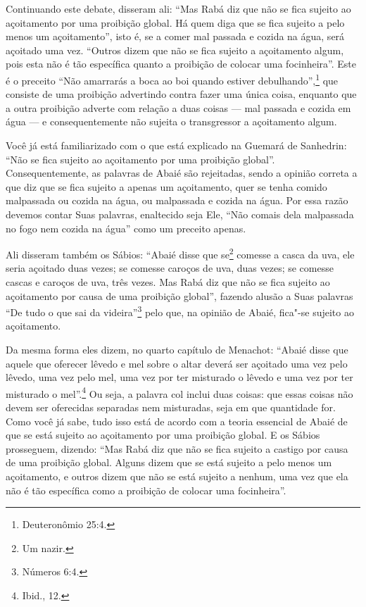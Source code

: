 Continuando este debate, disseram ali: ``Mas Rabá\starr{} diz que não se fica
sujeito ao açoitamento por uma proibição global. Há quem diga que se
fica sujeito a pelo menos um açoitamento'', isto é, se a comer mal
passada e cozida na água, será açoitado uma vez. ``Outros dizem que não
se fica sujeito a açoitamento algum, pois esta não é tão específica
quanto a proibição de colocar uma focinheira''. Este é o preceito ``Não
amarrarás a boca ao boi quando estiver debulhando'',\footnote{Deuteronômio
25:4.} que consiste de uma proibição advertindo contra fazer uma única
coisa, enquanto que a outra proibição adverte com relação a duas coisas
--- mal passada e cozida em água --- e consequentemente não sujeita o
transgressor a açoitamento algum.


Você já está familiarizado com o que está explicado na Guemará\starr{} de
Sanhedrin\starr: ``Não se fica sujeito ao açoitamento por uma proibição
global''. Consequentemente, as palavras de Abaié\starr{} são rejeitadas, sendo
a opinião correta a que diz que se fica sujeito a apenas um açoitamento,
quer se tenha comido malpassada ou cozida na água, ou malpassada e
cozida na água. Por essa razão devemos contar Suas palavras, enaltecido
seja Ele, ``Não comais dela malpassada no fogo nem cozida na água''
como um preceito apenas.

Ali disseram também os Sábios: ``Abaié\starr{} disse que se\footnote{Um nazir\starr.}
comesse a casca da uva, ele seria açoitado duas vezes; se comesse
caroços de uva, duas vezes; se comesse cascas e caroços de uva, três
vezes. Mas Rabá\starr{} diz que não se fica sujeito ao açoitamento por causa de
uma proibição global'', fazendo alusão a Suas palavras ``De tudo o que
sai da videira''\footnote{Números 6:4.} pelo que, na opinião de Abaié\starr, fica"-se
sujeito ao açoitamento.

Da mesma forma eles dizem, no quarto capítulo de Menachot\starr: ``Abaié\starr{} disse
que aquele que oferecer lêvedo e mel sobre o altar deverá ser açoitado
uma vez pelo lêvedo, uma vez pelo mel, uma vez por ter misturado o
lêvedo e uma vez por ter misturado o mel''.\footnote{Ibid., 12.} Ou seja, a palavra
col\starr{} inclui duas coisas: que essas coisas não devem ser oferecidas
separadas nem misturadas, seja em que quantidade for. Como você já sabe,
tudo isso está de acordo com a teoria essencial de Abaié\starr{} de que se está
sujeito ao açoitamento por uma proibição global. E os Sábios
prosseguem, dizendo: ``Mas Rabá\starr{} diz que não se fica sujeito a castigo
por causa de uma proibição global. Alguns dizem que se está sujeito a
pelo menos um açoitamento, e outros dizem que não se está sujeito a
nenhum, uma vez que ela não é tão específica como a proibição de colocar
uma focinheira''.

